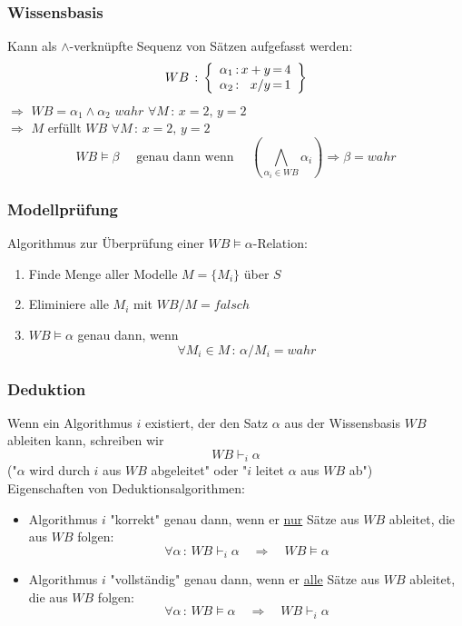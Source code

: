 \subsubsection*{Wissensbasis}
Kann als $\wedge$-verknüpfte Sequenz von Sätzen aufgefasst werden:
$$WB \, : \, \left\{ \begin{array}{r @{\, : \,} r @{\, = \,} l} \alpha_1 & x+y & 4 \\ \alpha_2 & x/y & 1 \end{array} \right\}$$
$\Rightarrow$ $WB = \alpha_1 \wedge \alpha_2$ $wahr$ $\forall M \, : \, x=2, \, y=2$ \\
$\Rightarrow$ $M$ erfüllt $WB$ $\forall M \, : \, x=2, \, y=2$ \\
$$WB \models \beta \quad \textrm{ genau dann wenn } \quad \left( \bigwedge\limits_{\alpha_i \in WB} \alpha_i \right) \Rightarrow \beta = wahr$$

\subsubsection*{Modellprüfung}

Algorithmus zur Überprüfung einer $WB \models \alpha$-Relation:
\begin{enumerate}
\item Finde Menge aller Modelle $M = \{M_i\}$ über $S$
\item Eliminiere alle $M_i$ mit $WB/M = falsch$
\item $WB \models \alpha$ genau dann, wenn $$\forall M_i \in M \, : \, \alpha / M_i = wahr$$
\end{enumerate}

\subsubsection*{Deduktion}

Wenn ein Algorithmus $i$ existiert, der den Satz $\alpha$ aus der Wissensbasis $WB$ ableiten kann, schreiben wir $$WB \vdash_i \alpha$$
("{}$\alpha$ wird durch $i$ aus $WB$ abgeleitet"{} oder "{}$i$ leitet $\alpha$ aus $WB$ ab"{}) \\[0,1cm]
Eigenschaften von Deduktionsalgorithmen:
\begin{itemize}
\item Algorithmus $i$ "{}korrekt"{} genau dann, wenn er \underline{nur} Sätze aus $WB$ ableitet, die aus $WB$ folgen: $$\forall \alpha \, : \, WB \vdash_i \alpha \quad \Rightarrow \quad WB \models \alpha$$
\item Algorithmus $i$ "{}vollständig"{} genau dann, wenn er \underline{alle} Sätze aus $WB$ ableitet, die aus $WB$ folgen: $$\forall \alpha \, : \, WB \models \alpha \quad \Rightarrow \quad WB \vdash_i \alpha$$
\end{itemize}

